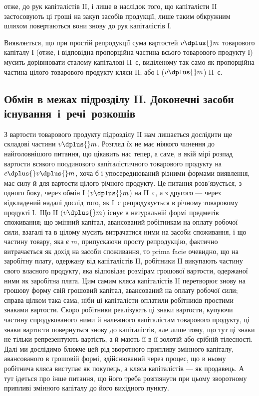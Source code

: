 \parcont{}  %
отже, до рук капіталістів II, і лише в наслідок того, що капіталісти II застосовують
ці гроші на закуп засобів продукції, лише таким обкружним
шляхом повертаються вони знову до рук капіталістів І.

\roztyagnut{}
Виявляється, що при простій репродукції сума вартостей $v \dplus{} m$ товарового
капіталу І (отже, і відповідна пропорційна частина всього товарового
продукту І) мусить дорівнювати сталому капіталові II~$с$, виділеному
так само як пропорційна частина цілого товарового продукту кляси II;
або І ($v \dplus{} m$) \deq{} II~$с$.

\subsection[Обмін в межах підрозділу II. Доконечні засоби існування і речі розкошів]{Обмін в межах підрозділу II. Доконечні засоби існування~і~речі~розкошів}

З вартости товарового продукту підрозділу II нам лишається дослідити
ще складові частини $v \dplus{} m$. Розгляд їх не має ніякого чинення до
найголовнішого питання, що цікавить нас тепер, а саме, в якій мірі
розпад вартости всякого поодинокого капіталістичного товарового продукту
на $c \dplus{} v \dplus{} m$, хоча б і упосереднюваний різними формами виявлення,
має силу й для вартости цілого річного продукту. Це питання
розв’язується, з одного боку, через обмін І ($v \dplus{} m$) на II~$с$, а з другого
— через відкладений надалі дослід того, як І~$с$ репродукується в
річному товаровому продукті І.~Що II ($v \dplus{} m$) існує в натуральній формі
предметів споживання; що змінний капітал, авансований робітникам на
оплату робочої сили, взагалі та в цілому мусить витрачатися ними на
засоби споживання, і що частину товару, яка є $m$, припускаючи просту
репродукцію, фактично витрачається як дохід на засоби споживання, то
prima facie очевидно, що на заробітну плату, одержану від капіталістів
II, робітники II викупають частину свого власного продукту, яка відповідає
розмірам грошової вартости, одержаної ними як заробітна плата. Цим
самим кляса капіталістів II перетворює знову на грошову форму свій
грошовий капітал, авансований на оплату робочої сили; справа цілком
така сама, ніби ці капіталісти оплатили робітників простими знаками вартости.
Скоро робітники реалізують ці знаки вартости, купуючи частину
спродукованого ними й належного капіталістам товарового продукту, ці
знаки вартости повернуться знову до капіталістів, але лише тому, що тут
ці знаки не тільки репрезентують вартість, а й мають її в її золотій
або срібній тілесності. Далі ми дослідимо ближче цей рід зворотного
припливу змінного капіталу, авансованого в грошовій формі, здійснюваний
через процес, що в ньому робітнича кляса виступає як покупець, а
кляса капіталістів — як продавець. А тут ідеться про інше питання,
що його треба розглянути при цьому зворотному припливі змінного
капіталу до його вихідного пункту.

